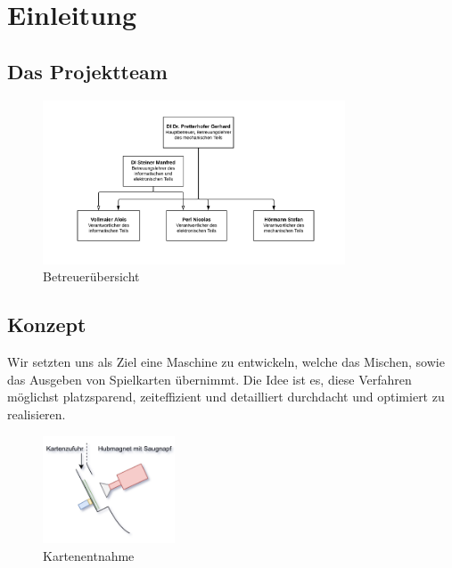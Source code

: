 

\chapter{Einleitung}

\section{Das Projektteam}
\label{sec:Einleitung}
\begin{figure}[H]
    \vspace{-30pt}
    \includegraphics[width=0.80\textwidth]{fig/Hierachie_Reshuffled.pdf}
    \caption{Betreuerübersicht}
    \label{Bild über ganze Seitenbreite}
\end{figure}


\section{Konzept}
Wir setzten uns als Ziel eine Maschine zu entwickeln, welche das Mischen, sowie das Ausgeben von Spielkarten übernimmt.
Die Idee ist es, diese Verfahren möglichst platzsparend, zeiteffizient und detailliert durchdacht und optimiert zu realisieren.\\

\begin{figure}
    \vspace{-40pt}
    \begin{center}
        \includegraphics[width=0.35\textwidth]{fig/Reshuffled_Version_3_prinzip}
    \end{center}
    \caption{Kartenentnahme}
    \label{Kartenentnahme}
    \vspace{-15pt}
\end{figure}

